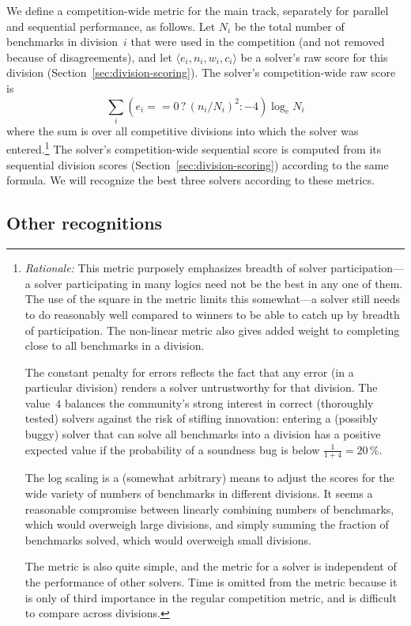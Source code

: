 \documentclass[12pt]{article}
\begin{document}
We define a competition-wide metric for the main track, separately for
parallel and sequential performance, as follows.  Let $N_i$ be the
total number of benchmarks in division~$i$ that were used in the
competition (and not removed because of disagreements), and let
$\langle e_i, n_i, w_i, c_i\rangle$ be a solver's raw score for this
division (Section~\ref{sec:division-scoring}).  The solver's
competition-wide raw score is
%
$$\sum_i (e_i == 0 \,?\, (n_i/N_i)^2 : -4) \log_e N_i$$
%
where the sum is over all competitive divisions into which the solver
was entered.\footnote{\emph{Rationale:} This metric purposely
  emphasizes breadth of solver participation---a solver participating
  in many logics need not be the best in any one of them.  The use of
  the square in the metric limits this somewhat---a solver still needs
  to do reasonably well compared to winners to be able to catch up by
  breadth of participation.  The non-linear metric also gives added
  weight to completing close to all benchmarks in a division.

  The constant penalty for errors reflects the fact that any error (in
  a particular division) renders a solver untrustworthy for that
  division.  The value~$4$ balances the community's strong interest in
  correct (thoroughly tested) solvers against the risk of stifling
  innovation: entering a (possibly buggy) solver that can solve all
  benchmarks into a division has a positive expected value if the
  probability of a soundness bug is below $\frac{1}{1+4} = 20$\,\%.
  
  The log scaling is a (somewhat arbitrary) means to adjust the scores
  for the wide variety of numbers of benchmarks in different
  divisions.  It seems a reasonable compromise between linearly
  combining numbers of benchmarks, which would overweigh large
  divisions, and simply summing the fraction of benchmarks solved,
  which would overweigh small divisions.

  The metric is also quite simple, and the metric for a solver is
  independent of the performance of other solvers.  Time is omitted
  from the metric because it is only of third importance in the
  regular competition metric, and is difficult to compare across
  divisions.}  The solver's competition-wide sequential score is
computed from its sequential division scores
(Section~\ref{sec:division-scoring}) according to the same formula.
We will recognize the best three solvers according to these metrics.

\subsection{Other recognitions}
\end{document}
